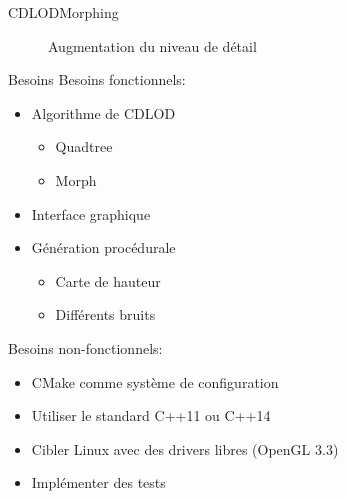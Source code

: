 \documentclass[french]{beamer}
\begin{document}
\begin{frame}{CDLOD}{Morphing}
\begin{figure}[H]
   
   \caption{Augmentation du niveau de détail}
\end{figure}


\end{frame}


\begin{frame}{Besoins}
  Besoins fonctionnels:
  \begin{itemize}
    \item Algorithme de CDLOD
      \begin{itemize}
        \item Quadtree
        \item Morph
      \end{itemize}
    \item Interface graphique
    \item Génération procédurale
      \begin{itemize}
        \item Carte de hauteur
        \item Différents bruits
      \end{itemize}
  \end{itemize}
  Besoins non-fonctionnels:
  \begin{itemize}
    \item CMake comme système de configuration
    \item Utiliser le standard C++11 ou C++14
    \item Cibler Linux avec des drivers libres (OpenGL 3.3)
    \item Implémenter des tests
  \end{itemize}
\end{frame}







\end{document}
